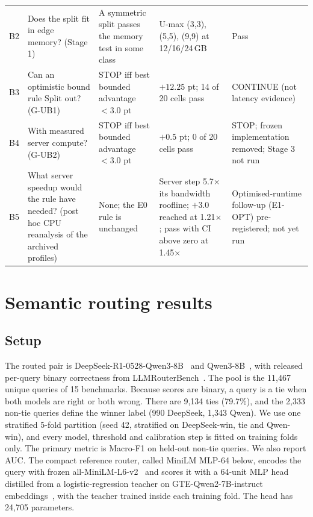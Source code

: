 \documentclass[lettersize,journal]{IEEEtran}
\begin{document}
\begin{table}[!t]
\begin{tabular}{@{}p{0.5cm}p{3.5cm}p{4.2cm}p{4.4cm}p{3.1cm}@{}}
B2 & Does the split fit in edge memory? (Stage 1) & A symmetric split passes the memory test in some class & U-max (3,3), (5,5), (9,9) at 12/16/24\,GB & Pass \\
B3 & Can an optimistic bound rule Split out? (G-UB1) & STOP iff best bounded advantage $<3.0$ pt & $+12.25$ pt; 14 of 20 cells pass & CONTINUE (not latency evidence) \\
B4 & With measured server compute? (G-UB2) & STOP iff best bounded advantage $<3.0$ pt & $+0.5$ pt; 0 of 20 cells pass & STOP; frozen implementation removed; Stage 3 not run \\
B5 & What server speedup would the rule have needed? (post hoc CPU reanalysis of the archived profiles) & None; the E0 rule is unchanged & Server step 5.7$\times$ its bandwidth roofline; $+3.0$ reached at 1.21$\times$; pass with CI above zero at 1.45$\times$ & Optimised-runtime follow-up (E1-OPT) pre-registered; not yet run \\
\bottomrule
\end{tabular}
\end{table}

\section{Semantic routing results}
\label{sec:a}

\subsection{Setup}
The routed pair is DeepSeek-R1-0528-Qwen3-8B~\cite{deepseekr1,deepseekr1qwen3card} and Qwen3-8B~\cite{qwen3}, with released per-query binary correctness from LLMRouterBench~\cite{dataset}. The pool is the 11,467 unique queries of 15 benchmarks. Because scores are binary, a query is a tie when both models are right or both wrong. There are 9,134 ties (79.7\%), and the 2,333 non-tie queries define the winner label (990 DeepSeek, 1,343 Qwen). We use one stratified 5-fold partition (seed 42, stratified on DeepSeek-win, tie and Qwen-win), and every model, threshold and calibration step is fitted on training folds only. The primary metric is Macro-F1 on held-out non-tie queries. We also report AUC. The compact reference router, called MiniLM MLP-64 below, encodes the query with frozen all-MiniLM-L6-v2~\cite{minilm,sbert} and scores it with a 64-unit MLP head distilled from a logistic-regression teacher on GTE-Qwen2-7B-instruct embeddings~\cite{gte}, with the teacher trained inside each training fold. The head has 24,705 parameters.
\end{document}
